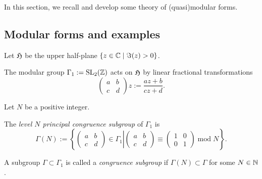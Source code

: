 
In this section, we recall and develop some theory of (quasi)modular forms.

\subsection{Modular forms and examples}

Let $\mathfrak{H}$ be the upper half-plane $\{z\in\mathbb{C}\mid\Im(z)>0\}$.
\begin{lemma}\label{def:Gamma-1-Action}
    The modular group $\Gamma_1:=\mathrm{SL}_2(\mathbb{Z})$ acts on $\mathfrak{H}$ by linear fractional transformations
$$\left(\begin{smallmatrix}a&b\\c&d\end{smallmatrix}\right)z:=\frac{az+b}{cz+d}.$$
\end{lemma}

Let $N$ be a positive integer.
\begin{definition}\label{def:level-N-princ-cong-subgp}
    The \emph{level $N$ principal congruence subgroup} of $\Gamma_1$ is
    $$\Gamma(N):=\left\{\left.\left(\begin{smallmatrix}a&b\\c&d\end{smallmatrix}\right)\in\Gamma_1\right|\left(\begin{smallmatrix}a&b\\c&d\end{smallmatrix}\right)\equiv\left(\begin{smallmatrix}1&0\\0&1\end{smallmatrix}\right)\;\mathrm{mod}\;N\right\}.$$
\end{definition}

\begin{definition}\label{def:congruence-subgroup}
    A subgroup $\Gamma\subset\Gamma_1$ is called a \emph{congruence subgroup} if $\Gamma(N)\subset\Gamma$ for some $N\in\mathbb{N}$.
\end{definition}

